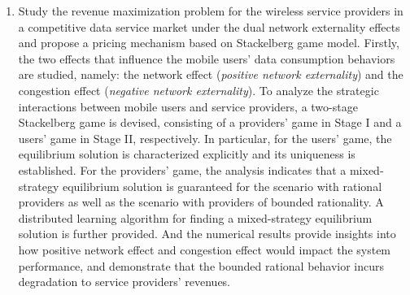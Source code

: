 \begin{englishabstract}
\begin{enumerate}
		
		\item Study the revenue maximization problem for the wireless service providers in a competitive data service market under the dual network externality effects and propose a pricing mechanism based on Stackelberg game model. 
Firstly, the two effects that influence the mobile users' data consumption behaviors are studied, namely: the network effect (\textsl{positive network externality}) and the congestion effect (\textsl{negative network externality}). To analyze the strategic interactions between mobile users and service providers, a two-stage Stackelberg game is devised, consisting of a providers' game in Stage I and a users' game in Stage II, respectively. In particular, for the users' game, the equilibrium solution is characterized explicitly and its uniqueness is established. For the providers' game, the analysis indicates that a mixed-strategy equilibrium solution is guaranteed for the scenario with rational providers as well as the scenario with providers of bounded rationality. A distributed learning algorithm for finding a mixed-strategy equilibrium solution is further provided. And the numerical results provide insights into how positive network effect and congestion effect would impact the system performance, and demonstrate that the bounded rational behavior incurs degradation to service providers' revenues.
		

\end{enumerate}
\end{englishabstract}
